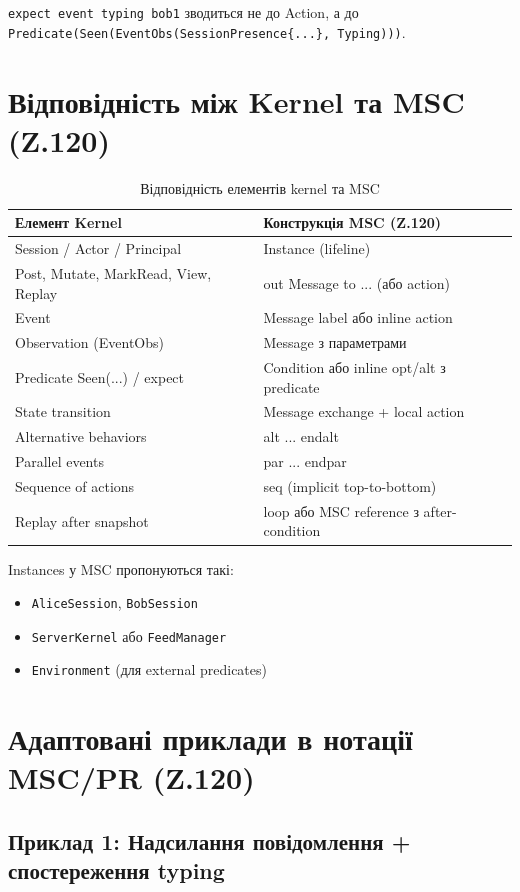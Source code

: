\documentclass[11pt,a4paper]{article}
\begin{document}
\texttt{expect event typing bob1} зводиться не до Action, а до \texttt{Predicate(Seen(EventObs(SessionPresence\{...\}, Typing)))}.

\section{Відповідність між Kernel та MSC (Z.120)}

\begin{table}[h]
\centering
\begin{tabular}{|l|l|}
\hline
\textbf{Елемент Kernel} & \textbf{Конструкція MSC (Z.120)} \\
\hline
Session / Actor / Principal & Instance (lifeline) \\
Post, Mutate, MarkRead, View, Replay & out Message to ... (або action) \\
Event & Message label або inline action \\
Observation (EventObs) & Message з параметрами \\
Predicate Seen(...) / expect & Condition або inline opt/alt з predicate \\
State transition & Message exchange + local action \\
Alternative behaviors & alt ... endalt \\
Parallel events & par ... endpar \\
Sequence of actions & seq (implicit top-to-bottom) \\
Replay after snapshot & loop або MSC reference з after-condition \\
\hline
\end{tabular}
\caption{Відповідність елементів kernel та MSC}
\end{table}

Instances у MSC пропонуються такі:
\begin{itemize}
    \item \texttt{AliceSession}, \texttt{BobSession}
    \item \texttt{ServerKernel} або \texttt{FeedManager}
    \item \texttt{Environment} (для external predicates)
\end{itemize}

\section{Адаптовані приклади в нотації MSC/PR (Z.120)}

\subsection{Приклад 1: Надсилання повідомлення + спостереження typing}
\end{document}
